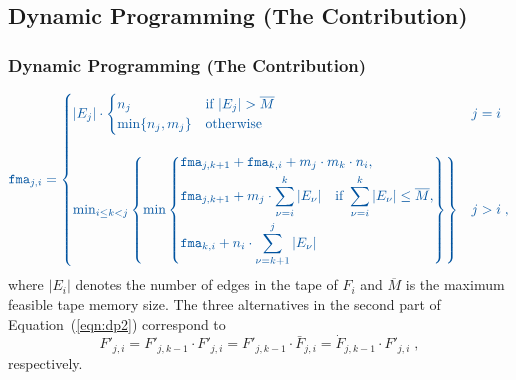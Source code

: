 \documentclass[ucs,10pt]{beamer}
\newcommand{\fma}{{\small {\tt fma}}}
\begin{document}
\subsection{Dynamic Programming (The Contribution)}

\begin{frame}
	\frametitle{Dynamic Programming (The Contribution)}
	{
\footnotesize
\begin{equation} \label{eqn:dp2}
	\textcolor{rwth-blue}{
\fma_{j,i}=
\begin{cases}
        \centering |E_j| \cdot
\begin{cases}
	n_j & \text{if}~|E_j| > \overline{M} \\
\min\{n_j,m_j\} & \text{otherwise}
\end{cases}
& j=i \\ \\
        \min_{i \leq k < j} \left \{ \min \left \{
\begin{split}
&\fma_{j,k+1}+\fma_{k,i} + m_j \cdot m_k \cdot n_i, \\
        &\fma_{j,k+1} +
m_j \cdot \sum_{\nu=i}^k |E_\nu| \quad \text{if}~\sum_{\nu=i}^k |E_\nu| \leq \overline{M}, \\
        &\fma_{k,i} + n_i \cdot \sum_{\nu=k+1}^j |E_\nu|
\end{split}
        \right \} \right \} & j>i \; ,
\end{cases}
	}
\end{equation}
	}
	\vfill
	where $|E_i|$ denotes the number of edges in the tape of $F_i$ and $\overline{M}$ is the maximum feasible tape memory size.
	\vfill
	The three alternatives in the second part of Equation~(\ref{eqn:dp2}) correspond to 
	$$F'_{j,i}=F'_{j,k-1} \cdot F'_{j,i}
	=F'_{j,k-1} \cdot \bar{F}_{j,i}
	=\dot{F}_{j,k-1} \cdot F'_{j,i} \; ,
	$$
	respectively.
\end{frame}
\end{document}

